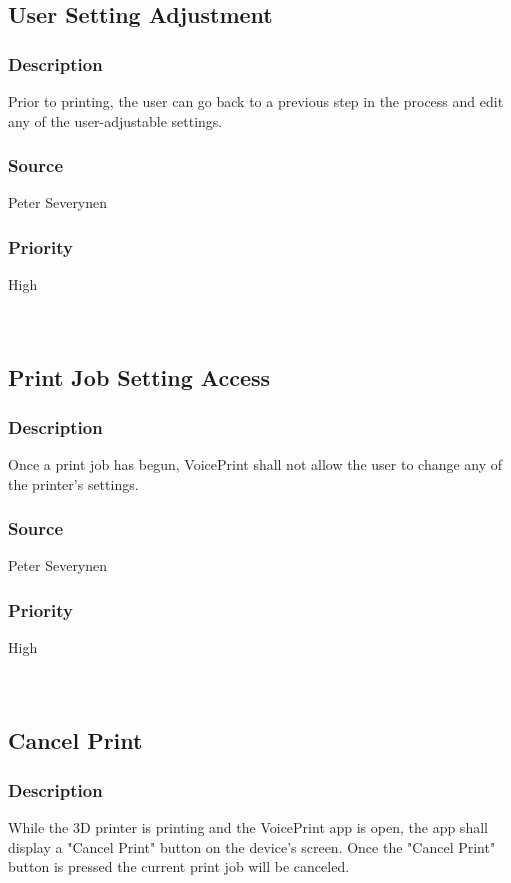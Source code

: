 \subsection{User Setting Adjustment}
\subsubsection{Description}
Prior to printing, the user can go back to a previous step in the process and edit any of the user-adjustable settings.
\subsubsection{Source}
Peter Severynen
\subsubsection{Priority}
High\\
\\
\\
\subsection{Print Job Setting Access}
\subsubsection{Description}
Once a print job has begun, VoicePrint shall not allow the user to change any of the printer's settings.
\subsubsection{Source}
Peter Severynen
\subsubsection{Priority}
High\\
\\
\\
\subsection{Cancel Print}
\subsubsection{Description}
While the 3D printer is printing and the VoicePrint app is open, the app shall display a "Cancel Print" button on the device's screen. Once the "Cancel Print" button is pressed the current print job will be canceled.
